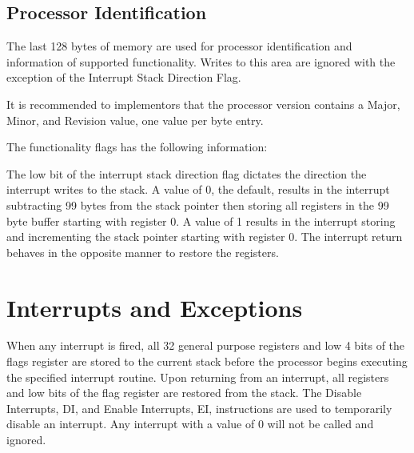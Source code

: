 


\section{Processor Identification}

The last 128 bytes of memory are used for processor identification and information of supported functionality. Writes to this area are ignored with the exception of the Interrupt Stack Direction Flag.








It is recommended to implementors that the processor version contains a Major, Minor, and Revision value, one value per byte entry.




The functionality flags has the following information:






The low bit of the interrupt stack direction flag dictates the direction the interrupt writes to the stack. A value of 0, the default, results in the interrupt subtracting 99 bytes from the stack pointer then storing all registers in the 99 byte buffer starting with register 0. A value of 1 results in the interrupt storing and incrementing the stack pointer starting with register 0. The interrupt return behaves in the opposite manner to restore the registers.




\chapter{Interrupts and Exceptions}

When any interrupt is fired, all 32 general purpose registers and low 4 bits of the flags register are stored to the current stack before the processor begins executing the specified interrupt routine. Upon returning from an interrupt, all registers and low bits of the flag register are restored from the stack. The Disable Interrupts, DI, and Enable Interrupts, EI, instructions are used to temporarily disable an interrupt. Any interrupt with a value of 0 will not be called and ignored.




